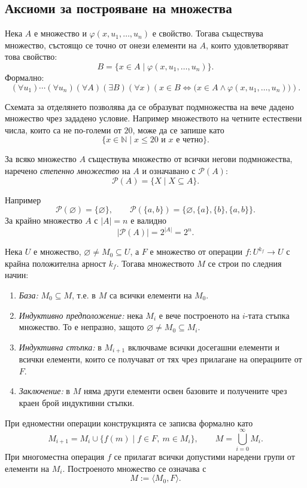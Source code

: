 \subsection{Аксиоми за построяване на множества}\label{s:1.1.1}

\begin{keyscheme}[За отделянето]
Нека $A$ е множество и $\varphi(x,u_1,\ldots,u_n)$ е свойство. Тогава съществува множество, състоящо се точно от онези елементи на $A$, които удовлетворяват това свойство:
\[
B=\{x\in A\mid \varphi(x,u_1,\ldots,u_n)\}.
\]
Формално:
\[
(\forall u_1)\cdots(\forall u_n)(\forall A)(\exists B)(\forall x)
\left(x\in B\Leftrightarrow
\bigl(x\in A\land\varphi(x,u_1,\ldots,u_n)\bigr)\right).
\]
\end{keyscheme}

Схемата за отделянето позволява да се образуват подмножества на вече дадено множество чрез зададено условие. Например множеството на четните естествени числа, които са не по-големи от $20$, може да се запише като
\[
\{x\in\mathbb N\mid x\leq 20\text{ и }x\text{ е четно}\}.
\]

\begin{keyaxiom}
За всяко множество $A$ съществува множество от всички негови подмножества, наречено \emph{степенно множество} на $A$ и означавано с $\mathcal P(A)$:
\[
\mathcal P(A)=\{X\mid X\subseteq A\}.
\]
\end{keyaxiom}

Например
\[
\mathcal P(\varnothing)=\{\varnothing\},
\qquad
\mathcal P(\{a,b\})=
\{\varnothing,\{a\},\{b\},\{a,b\}\}.
\]
За крайно множество $A$ с $|A|=n$ е валидно
\[
|\mathcal P(A)|=2^{|A|}=2^n.
\]

\begin{keyaxiom}
Нека $U$ е множество, $\varnothing\ne M_0\subseteq U$, а $F$ е множество от операции $f:U^{k_f}\to U$ с крайна положителна арност $k_f$. Тогава множеството $M$ се строи по следния начин:

\begin{enumerate}
\item \emph{База:} $M_0\subseteq M$, т.е. в $M$ са всички елементи на $M_0$.
\item \emph{Индуктивно предположение:} нека $M_i$ е вече построеното на $i$-тата стъпка множество. То е непразно, защото $\varnothing\neq M_0\subseteq M_i$.
\item \emph{Индуктивна стъпка:} в $M_{i+1}$ включваме всички досегашни елементи и всички елементи, които се получават от тях чрез прилагане на операциите от $F$.
\item \emph{Заключение:} в $M$ няма други елементи освен базовите и получените чрез краен брой индуктивни стъпки.
\end{enumerate}

При едноместни операции конструкцията се записва формално като
\[
M_{i+1}=M_i\cup\{f(m)\mid f\in F,\ m\in M_i\},
\qquad
M=\bigcup_{i=0}^{\infty}M_i.
\]
При многоместна операция $f$ се прилагат всички допустими наредени групи от елементи на $M_i$. Построеното множество се означава с
\[
M:=\langle M_0,F\rangle.
\]
\end{keyaxiom}

